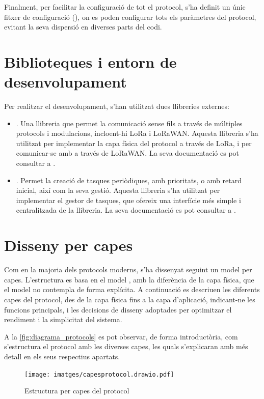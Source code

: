 \documentclass{tfgitic}[2024/07/01]
\begin{document}
Finalment, per facilitar la configuració de tot el protocol, s'ha definit un únic fitxer de configuració (), on es poden configurar tots els paràmetres del protocol, evitant la seva dispersió en diverses parts del codi.

\section{Biblioteques i entorn de desenvolupament}
Per realitzar el desenvolupament, s'han utilitzat dues llibreries externes:
\begin{itemize}
    \item {}. Una llibreria que permet la comunicació sense fils a través de múltiples protocols i modulacions, incloent-hi LoRa i LoRaWAN. Aquesta llibreria s'ha utilitzat per implementar la capa física del protocol a través de LoRa, i per comunicar-se amb  a través de LoRaWAN. La seva documentació es pot consultar a \cite{jan_gromes_radiolib_nodate}.
    \item {}. Permet la creació de tasques periòdiques, amb prioritats, o amb retard inicial, així com la seva gestió. Aquesta llibreria s'ha utilitzat per implementar el gestor de tasques, que ofereix una interfície més simple i centralitzada de la llibreria. La seva documentació es pot consultar a \cite{arkhipenko_taskscheduler_nodate}.
\end{itemize}

\section{Disseny per capes}
Com en la majoria dels protocols moderns, s'ha dissenyat seguint un model per capes. L'estructura es basa en el model , amb la diferència de la capa física, que el model  no contempla de forma explícita.
A continuació es descriuen les diferents capes del protocol, des de la capa física fins a la capa d'aplicació, indicant-ne les funcions principals, i les decisions de disseny adoptades per optimitzar el rendiment i la simplicitat del sistema.

A la \autoref{fig:diagrama_protocols} es pot observar, de forma introductòria, com s'estructura el protocol amb les diverses capes, les quals s'explicaran amb més detall en els seus respectius apartats. 
\begin{figure}
    \centering
    \texttt{[image: imatges/capesprotocol.drawio.pdf]}
    \caption{Estructura per capes del protocol}
    \label{fig:diagrama_protocols}
\end{figure}
\end{document}
